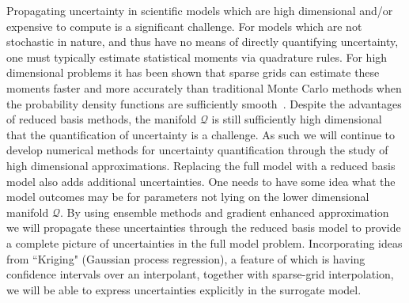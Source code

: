\documentclass[a4paper,fontsize=12pt]{scrartcl}
\begin{document}
Propagating uncertainty in scientific models which are high dimensional 
and/or expensive to compute is a significant challenge.
For models which are not stochastic in nature, and thus have no means
of directly quantifying uncertainty, one must typically estimate statistical 
moments via quadrature rules. For high dimensional problems 
it has been shown that sparse grids can estimate these moments faster 
and more accurately than traditional Monte Carlo methods when the 
probability density functions are sufficiently smooth~\parencite{JakemanRoberts2013,FranzelinDiehlPfluger2014}.
Despite the advantages of reduced basis methods, the manifold $\mathcal{Q}$
is still sufficiently high dimensional that the quantification of uncertainty
is a challenge. As such we will continue to develop numerical methods for 
uncertainty quantification through the study of high dimensional approximations.
Replacing the full model with a reduced basis model also adds additional 
uncertainties. One needs to have some idea what the model outcomes may be 
for parameters not lying on the lower dimensional manifold $\mathcal{Q}$.
By using ensemble methods and gradient enhanced 
approximation~\parencite{deBaarHarding2015,Jakeman2015} we will
propagate these uncertainties through the reduced basis model 
to provide a complete picture of uncertainties in the full model problem.
Incorporating ideas from ``Kriging" (Gaussian process regression), a feature of which is having 
confidence intervals over an interpolant, together with sparse-grid interpolation,
we will be able to express uncertainties explicitly in the surrogate model.\\


\\
\end{document}
